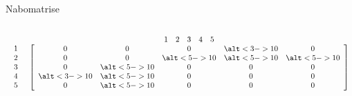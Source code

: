 \documentclass[14pt]{beamer}
\begin{document}
\begin{frame}{Nabomatrise}
\begin{columns}
            \begin{math}
                \begin{array}{c c} &
                \begin{array}{c c c c c} 1 & 2 & 3 & 4 & 5 \\
                \end{array}
                \\
                \begin{array}{c c c c c}
                1 \\ 2 \\ 3 \\ 4 \\ 5
                \end{array}
                &
                \left[
                \begin{array}{c c c c c}
                0 & 0 & 0 & \alt<3->{1}{0} & 0 \\
                0 & 0 & \alt<5->{1}{0} & \alt<5->{1}{0} & \alt<5->{1}{0} \\
                0 & \alt<5->{1}{0} & 0 & 0 & 0 \\
                \alt<3->{1}{0} & \alt<5->{1}{0} & 0 & 0 & 0 \\
                0 & \alt<5->{1}{0} & 0 & 0 & 0 \\
                \end{array}
                \right]
                \end{array}
            \end{math}
    \end{columns}
\end{frame}
\end{document}
